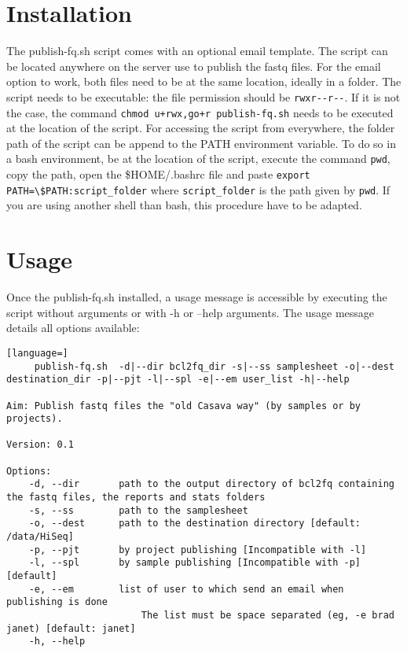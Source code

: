\documentclass[11pt]{report}
\begin{document}
 \section{Installation}

The publish-fq.sh script comes with an optional email template. The script can be located anywhere on the server use to publish the fastq files. For the email option to work, both files need to be at the same location, ideally in a folder. The script needs to be executable: the file permission should be \lstinline[basicstyle=\ttfamily]{rwxr--r--}. If it is not the case, the command \lstinline[basicstyle=\ttfamily]{chmod u+rwx,go+r publish-fq.sh} needs to be executed at the location of the script. For accessing the script from everywhere, the folder path of the script can be append to the PATH environment variable. To do so in a bash environment, be at the location of the script, execute the command \lstinline[basicstyle=\ttfamily]{pwd}, copy the path, open the \$HOME/.bashrc file and paste \lstinline[basicstyle=\ttfamily]{export PATH=\$PATH:script_folder} where \lstinline[basicstyle=\ttfamily]{script_folder} is the path given by \lstinline[basicstyle=\ttfamily]{pwd}. If you are using another shell than bash, this procedure have to be adapted.


 \section{Usage}

Once the publish-fq.sh installed, a usage message is accessible by executing the script without arguments or with -h or --help arguments. The usage message details all options available:

\begin{lstlisting}[language=]
     publish-fq.sh  -d|--dir bcl2fq_dir -s|--ss samplesheet -o|--dest destination_dir -p|--pjt -l|--spl -e|--em user_list -h|--help

Aim: Publish fastq files the "old Casava way" (by samples or by projects).

Version: 0.1

Options:
    -d, --dir       path to the output directory of bcl2fq containing the fastq files, the reports and stats folders
    -s, --ss        path to the samplesheet
    -o, --dest      path to the destination directory [default: /data/HiSeq]
    -p, --pjt       by project publishing [Incompatible with -l]
    -l, --spl       by sample publishing [Incompatible with -p] [default]
    -e, --em        list of user to which send an email when publishing is done
                        The list must be space separated (eg, -e brad janet) [default: janet]
    -h, --help
\end{lstlisting}
\end{document}
